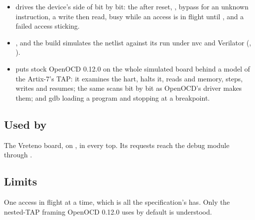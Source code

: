 \begin{itemize}
\item {} drives the device's side of
 bit by bit: the  after reset,
, bypass for an unknown instruction, a  write
then read, busy while an access is in flight until ,
and a failed access sticking.
\item {}, and the build simulates the
netlist against its run under nvc and Verilator
(, ).
\item {} puts stock OpenOCD 0.12.0 on
the whole simulated board behind a model of the Artix-7's TAP: it
examines the hart, halts it, reads  and memory, steps,
writes and resumes; the same  scans bit by bit as
OpenOCD's driver makes them; and gdb loading a program and stopping
at a breakpoint.
\end{itemize}

\subsection*{Used by}

The Vreteno board, on , in every top. Its requests reach
the debug module through .

\subsection*{Limits}

One access in flight at a time, which is all the specification's
 has. Only the nested-TAP framing OpenOCD 0.12.0 uses by default is understood.
